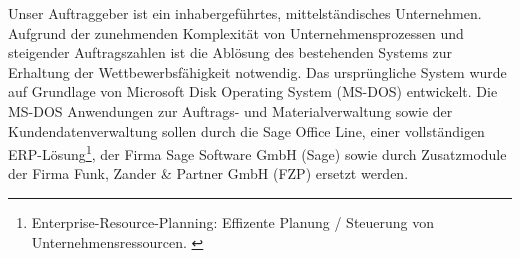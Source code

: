 Unser Auftraggeber ist ein inhabergeführtes, mittelständisches Unternehmen. Aufgrund der zunehmenden Komplexität von Unternehmensprozessen und steigender Auftragszahlen ist die Ablösung des bestehenden Systems zur Erhaltung der Wettbewerbsfähigkeit notwendig. Das ursprüngliche System wurde auf Grundlage von Microsoft Disk Operating System (MS-DOS) entwickelt. Die MS-DOS Anwendungen zur Auftrags- und Materialverwaltung sowie der Kundendatenverwaltung sollen durch die Sage Office Line, einer vollständigen ERP-Lösung\footnote{\label{foot:1}Enterprise-Resource-Planning: Effizente Planung / Steuerung von Unternehmensressourcen. \cite{ERP}}, der Firma Sage Software GmbH (Sage) sowie durch Zusatzmodule der Firma Funk, Zander \& Partner GmbH (FZP) ersetzt werden. \cite{einleitung1}